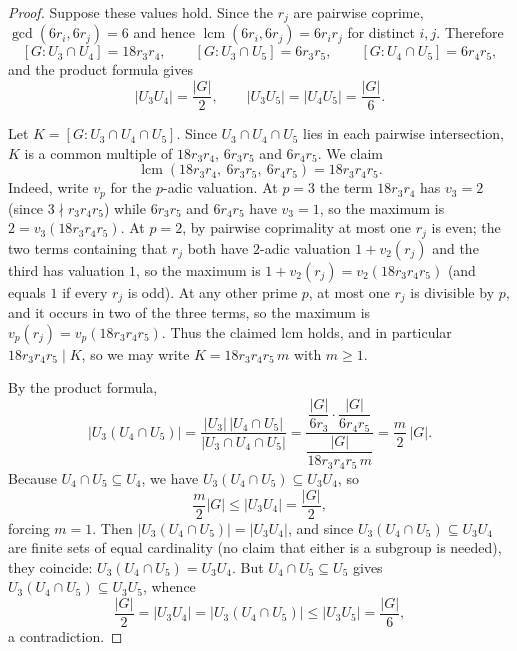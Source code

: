 \documentclass[10pt,a4paper]{amsart}
\newcommand{\lcm}{\operatorname{lcm}}
\begin{document}
\begin{proof}
Suppose these values hold. Since the $r_j$ are pairwise coprime, $\gcd(6r_i,6r_j)=6$ and hence $\lcm(6r_i,6r_j)=6r_ir_j$ for distinct $i,j$. Therefore
\[
[G:U_3\cap U_4]=18r_3r_4,\qquad
[G:U_3\cap U_5]=6r_3r_5,\qquad
[G:U_4\cap U_5]=6r_4r_5,
\]
and the product formula gives
\[
|U_3U_4|=\frac{|G|}{2},\qquad |U_3U_5|=|U_4U_5|=\frac{|G|}{6}.
\]

Let $K=[G:U_3\cap U_4\cap U_5]$. Since $U_3\cap U_4\cap U_5$ lies in each pairwise intersection, $K$ is a common multiple of $18r_3r_4$, $6r_3r_5$ and $6r_4r_5$. We claim
\[
\lcm(18r_3r_4,\ 6r_3r_5,\ 6r_4r_5)=18r_3r_4r_5.
\]
Indeed, write $v_p$ for the $p$-adic valuation. At $p=3$ the term $18r_3r_4$ has $v_3=2$ (since $3\nmid r_3r_4r_5$) while $6r_3r_5$ and $6r_4r_5$ have $v_3=1$, so the maximum is $2=v_3(18r_3r_4r_5)$. At $p=2$, by pairwise coprimality at most one $r_j$ is even; the two terms containing that $r_j$ both have $2$-adic valuation $1+v_2(r_j)$ and the third has valuation $1$, so the maximum is $1+v_2(r_j)=v_2(18r_3r_4r_5)$ (and equals $1$ if every $r_j$ is odd). At any other prime $p$, at most one $r_j$ is divisible by $p$, and it occurs in two of the three terms, so the maximum is $v_p(r_j)=v_p(18r_3r_4r_5)$. Thus the claimed lcm holds, and in particular $18r_3r_4r_5 \mid K$, so we may write $K=18r_3r_4r_5\,m$ with $m\ge 1$.

By the product formula,
\[
|U_3(U_4\cap U_5)|
=\frac{|U_3|\,|U_4\cap U_5|}{|U_3\cap U_4\cap U_5|}
=\frac{\dfrac{|G|}{6r_3}\cdot\dfrac{|G|}{6r_4r_5}}{\dfrac{|G|}{18r_3r_4r_5\,m}}
=\frac{m}{2}\,|G|.
\]
Because $U_4\cap U_5\subseteq U_4$, we have $U_3(U_4\cap U_5)\subseteq U_3U_4$, so
\[
\frac{m}{2}|G| \le |U_3U_4|=\frac{|G|}{2},
\]
forcing $m=1$. Then $|U_3(U_4\cap U_5)|=|U_3U_4|$, and since $U_3(U_4\cap U_5)\subseteq U_3U_4$ are finite sets of equal cardinality (no claim that either is a subgroup is needed), they coincide: $U_3(U_4\cap U_5)=U_3U_4$. But $U_4\cap U_5\subseteq U_5$ gives $U_3(U_4\cap U_5)\subseteq U_3U_5$, whence
\[
\frac{|G|}{2}=|U_3U_4|=|U_3(U_4\cap U_5)|\le |U_3U_5|=\frac{|G|}{6},
\]
a contradiction.
\end{proof}
\end{document}
